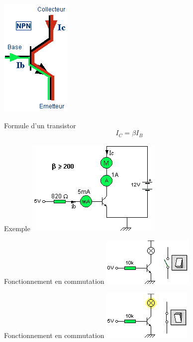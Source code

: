 \documentclass{beamer}
\begin{document}
\begin{frame}{}
  \centering
  \includegraphics[height=.4\textheight]{images/principe_transistor}
  \begin{alertblock}{Formule d'un transistor}
    $$I_C = \beta I_B$$
  \end{alertblock}
\end{frame}

\begin{frame}{Exemple}
  \centering
  \includegraphics[height=.5\textheight]{images/exemple_moteur}
\end{frame}

\begin{frame}{Fonctionnement en commutation}
  \centering
  \includegraphics[height=.4\textheight]{images/transistor_ouvert}
\end{frame}

\begin{frame}{Fonctionnement en commutation}
  \centering
  \includegraphics[height=.4\textheight]{images/transistor_ferme}
\end{frame}
\end{document}
